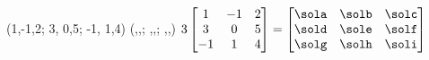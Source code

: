 (1,-1,2;
                        3, 0,5;
                       -1, 1,4)%
                      (\sola,\solb,\solc;
                       \sold,\sole,\solf;
                       \solg,\solh,\soli)
$3\begin{bmatrix}
     1 & -1 & 2 \\ 3 & 0 & 5 \\ -1 & 1 & 4
 \end{bmatrix}
  =\begin{bmatrix}
       \sola & \solb & \solc \\
       \sold & \sole & \solf \\
       \solg & \solh & \soli
   \end{bmatrix}$
